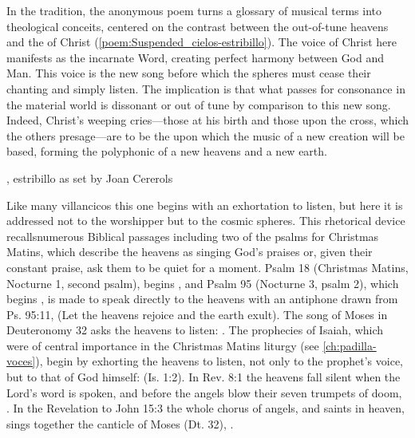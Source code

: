 In the  tradition, the anonymous poem turns a glossary of
musical terms into theological conceits, centered on the contrast between the
out-of-tune heavens and the  of Christ
(\cref{poem:Suspended_cielos-estribillo}).
The voice of Christ here manifests as the incarnate Word, creating
perfect harmony between God and Man. 
This voice is the new song before which the spheres must cease their chanting
and simply listen.
The implication is that what passes for consonance in the material world is
dissonant or out of tune by comparison to this new song.
Indeed, Christ's weeping cries---those at his birth and those upon the cross,
which the others presage---are to be the  upon which the
music of a new creation will be based, forming the polyphonic 
of a new heavens and a new earth.%

{, estribillo as set by Joan Cererols}

Like many villancicos this one begins with an exhortation to listen, but here it
is addressed not to the worshipper but to the cosmic spheres. 
This rhetorical device recallsnumerous Biblical passages including two of the
psalms for Christmas Matins, which describe the heavens as singing God's praises
or, given their constant praise, ask them to be quiet for a moment.
Psalm 18 (Christmas Matins, Nocturne 1, second psalm), begins , and Psalm 95 (Nocturne 3, psalm 2), which
begins , is made to speak directly
to the heavens with an antiphone drawn from Ps. 95:11,  (Let the heavens rejoice and the earth exult).%
    \Autocite[169--179]{Catholic:Breviarium1631}
The song of Moses in Deuteronomy 32 asks the heavens to listen: . 
The prophecies of Isaiah, which were of central importance in the Christmas
Matins liturgy (see \cref{ch:padilla-voces}), begin by exhorting the heavens to
listen, not only to the prophet's voice, but to that of God himself:
 (Is. 1:2).
In Rev. 8:1 the heavens fall silent when the Lord's word is spoken, and before
the angels blow their seven trumpets of doom, .
In the Revelation to John 15:3 the whole chorus of angels,  and saints in heaven, sings together the canticle of Moses (Dt. 32),
.

